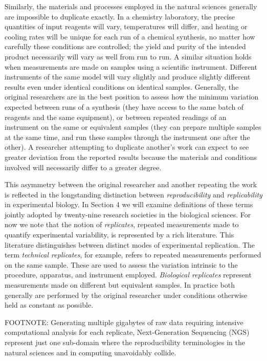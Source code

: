 Similarly, the materials and processes employed in the natural sciences generally are impossible
	to duplicate exactly.
In a chemistry laboratory, the precise quantities of input reagents will vary, temperatures will differ, and heating
	or cooling rates will be unique for each run of a chemical synthesis, no matter how carefully these conditions
	are controlled; the yield and purity of the intended product necessarily will vary as well from run to run.
A similar situation holds when measurements are made on samples using a scientific instrument. 
Different instruments of the same model will vary slightly and produce slightly different results even
	under identical conditions on identical samples.
Generally, the original researchers are in the best position to assess how the minimum variation expected
	between runs of a synthesis (they have access to the same batch of reagents and the same equipment), 
	or between repeated readings of an instrument on the same or equivalent samples (they can prepare
	multiple samples at the same time, and run these samples through the instrument one after the other).
A researcher attempting to duplicate another's work can expect to see greater deviation from the reported results	
	because the materials and conditions involved will necessarily differ to a greater degree.

This asymmetry between the original researcher and another repeating the work is reflected in the longstanding
	distinction between \emph{reproducibility} and \emph{replicability} in experimental biology.  
In Section 4 we will examine definitions of these terms jointly adopted by twenty-nine research
	societies in the biological sciences.  
For now we note that the notion of \emph{replicates}, repeated measurements made to quantify 
	experimental variability, is represented by a rich literature.
This literature distinguishes between distinct modes of experimental replication.
The term \emph{technical replicates}, for example, refers to repeated measurements performed on the same sample.
These are used to assess the variation intrinsic to the procedure, apparatus, and instrument employed.
\emph{Biological replicates} represent measurements made on different but equivalent samples.
In practice both generally are performed by the original researcher under conditions otherwise
	held as constant as possible.

FOOTNOTE: Generating multiple gigabytes of raw data requiring intensive computational analysis for each replicate, 
	Next-Generation Sequencing (NGS) represent just one sub-domain where the reproducibility 
	terminologies in the natural sciences and in computing unavoidably collide.

